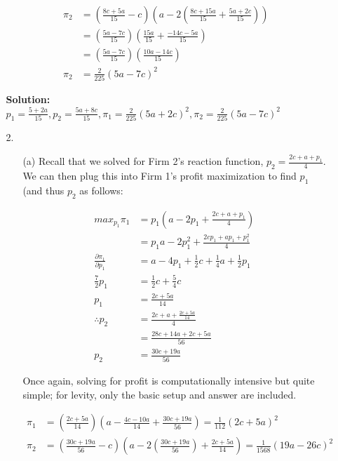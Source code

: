 \documentclass[12pt,letterpaper]{article}
\begin{document}
\begin{enumerate}
\begin{enumerate}
    \begin{align*}
        \pi_2 &= (\frac{8c + 5a}{15} - c)(a - 2(\frac{8c + 15a}{15} + \frac{5a + 2c}{15})) \\
        &= (\frac{5a - 7c}{15})(\frac{15a}{15} + \frac{-14c - 5a}{15}) \\
        &= (\frac{5a - 7c}{15})(\frac{10a - 14c}{15}) \\
        \pi_2 &= \frac{2}{225}(5a-7c)^2
    \end{align*}

    {\color{blue}\textbf{Solution:} $p_1 = \frac{5 + 2a}{15}, p_2 = \frac{5a + 8c}{15}, \pi_1 = \frac{2}{225}(5a + 2c)^2, \pi_2 = \frac{2}{225}(5a-7c)^2$}
    \item[2.] 
    
    \begin{enumerate}
    
    \item[(a)] Recall that we solved for Firm 2's reaction function, $p_2 = \frac{2c + a + p_1}{4}$. We can then plug this into Firm 1's profit maximization to find $p_1$ (and thus $p_2$ as follows:
    
    \begin{align*}
        max_{p_1} \pi_1 &= p_1 (a - 2p_1 + \frac{2c + a + p_1}{4}) \\
        &= p_1 a - 2p_1^2 + \frac{2cp_1 + ap_1 + p_1^2}{4} \\
        \frac{\partial \pi_1}{\partial p_1} &= a - 4p_1 + \frac{1}{2}c + \frac{1}{4}a + \frac{1}{2}p_1 \\
        \frac{7}{2}p_1 &= \frac{1}{2}c + \frac{5}{4}c \\
        p_1 &= \frac{2c + 5a}{14} \\
        \therefore p_2 &= \frac{2c + a + \frac{2c + 5a}{14}}{4} \\
        &= \frac{28c + 14a + 2c + 5a}{56} \\
        p_2 &= \frac{30c + 19a}{56}
    \end{align*}

    Once again, solving for profit is computationally intensive but quite simple; for levity, only the basic setup and answer are included.

    \begin{align*}
        \pi_1 &= (\frac{2c + 5a}{14})(a - \frac{4c-10a}{14} + \frac{30c + 19a}{56}) = \frac{1}{112}(2c + 5a)^2 \\
        \pi_2 &= (\frac{30c + 19a}{56} -c)(a - 2(\frac{30c + 19a}{56}) + \frac{2c + 5a}{14}) = \frac{1}{1568}(19a - 26c)^2
    \end{align*}


\end{enumerate}
\end{enumerate}
\end{enumerate}
\end{document}
